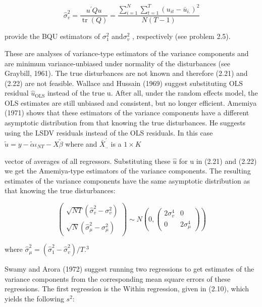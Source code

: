 \documentclass[
]{book}
\begin{document}
\begin{equation}
\widehat{\sigma}_{v}^{2}=\frac{u^{\prime} Q u}{\operatorname{tr}(Q)}=\frac{\sum_{i=1}^{N} \sum_{t=1}^{T}\left(u_{i t}-\bar{u}_{i .}\right)^{2}}{N(T-1)}
\end{equation}

provide the BQU estimators of \(\sigma_1^2\) and\(\sigma_v^2\) , respectively (see problem 2.5).

These are analyses of variance-type estimators of the variance components and are minimum variance-unbiased under normality of the disturbances (see Graybill, 1961). The true disturbances are not known and therefore (2.21) and (2.22) are not feasible. Wallace and Hussain (1969) suggest substituting OLS residual \(\widehat{u}_{\mathrm{OLS}}\) instead of the true u. After all, under the random effects model, the OLS estimates are still unbiased and consistent, but no longer efficient. Amemiya (1971) shows that these estimators of the variance components have a different asymptotic distribution from that knowing the true disturbances. He suggests using the LSDV residuals instead of the OLS residuals. In this case \(\tilde{u}=y-\tilde{\alpha} \iota_{N T}-X \widetilde{\beta}\) where and \(\bar{X}_{. .}^{\prime}\) is a \(1 \times K\)

vector of averages of all regressors. Substituting these \(\hat{u}\) for u in (2.21) and (2.22) we get the Amemiya-type estimators of the variance components. The resulting estimates of the variance components have the same asymptotic distribution as that knowing the true disturbances:

\begin{equation}
\left(\begin{array}{c}
\sqrt{N T}\left(\widehat{\sigma}_{v}^{2}-\sigma_{v}^{2}\right) \\
\sqrt{N}\left(\widehat{\sigma}_{\mu}^{2}-\sigma_{\mu}^{2}\right)
\end{array}\right) \sim N\left(0,\left(\begin{array}{cc}
2 \sigma_{v}^{4} & 0 \\
0 & 2 \sigma_{\mu}^{4}
\end{array}\right)\right)
\end{equation}

where \(\widehat{\sigma}_{\mu}^{2}=\left(\widehat{\sigma}_{1}^{2}-\widehat{\sigma}_{v}^{2}\right) / T .^{3}\)

Swamy and Arora (1972) suggest running two regressions to get estimates of the variance components from the corresponding mean square errors of these regressions. The first regression is the Within regression, given in (2.10), which yields the following \(s^2\):
\end{document}
